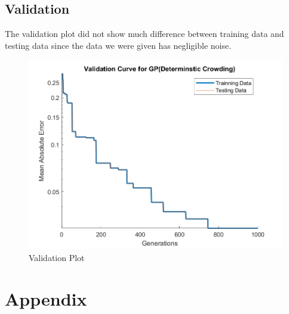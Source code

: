 \documentclass[12pt]{article}
\begin{document}
\newpage
\subsection{Validation}
The validation plot did not show much difference between training data and testing data since the data we were given has negligible noise.
\begin{figure}[H]
	\centering
	\includegraphics[width=\textwidth]{validationPlot}
	\caption[]%
	{{\small Validation Plot}}    
\end{figure}

\newpage
\section{Appendix}

\end{document}

